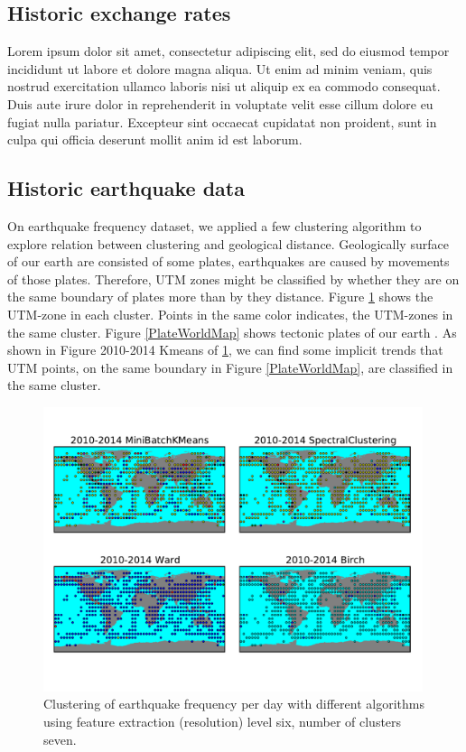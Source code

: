 \documentclass{article}
\begin{document}
\subsection{Historic exchange rates}
Lorem ipsum dolor sit amet, consectetur adipiscing elit, sed do eiusmod tempor incididunt ut labore et dolore magna aliqua. Ut enim ad minim veniam, quis nostrud exercitation ullamco laboris nisi ut aliquip ex ea commodo consequat. Duis aute irure dolor in reprehenderit in voluptate velit esse cillum dolore eu fugiat nulla pariatur. Excepteur sint occaecat cupidatat non proident, sunt in culpa qui officia deserunt mollit anim id est laborum.


\subsection{Historic earthquake data}
On earthquake frequency dataset, we applied a few clustering algorithm to explore relation between clustering and geological distance. Geologically surface of our earth are consisted of some plates, earthquakes are caused by movements of those plates. Therefore, UTM zones might be classified by whether they are on the same boundary of plates more than by they distance.
Figure \ref{EarthquakeWorldMap} shows the UTM-zone in each cluster. Points in the same color indicates, the UTM-zones in the same cluster. Figure \ref{PlateWorldMap} shows tectonic plates of our earth \cite{WTP15}. As shown in Figure 2010-2014 Kmeans of \ref{EarthquakeWorldMap},
we can find some implicit trends that UTM points, on the same boundary in Figure \ref{PlateWorldMap}, are classified in the same cluster.

\begin{figure}
\includegraphics[width=0.99\textwidth]{../earthquakedata/output_map_plot/grid(year=2010-2014,level=6,number_of_cluster=7).pdf}
\caption{Clustering of earthquake frequency per day with different algorithms
using feature extraction (resolution) level six, number of clusters seven.}
\label{EarthquakeWorldMap}
\end{figure}
\end{document}
